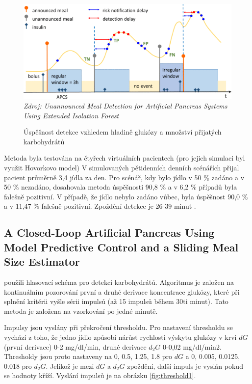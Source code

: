 \begin{figure}[H]
\caption{Úspěšnost detekce vzhledem hladině glukózy a množství přijatých karbohydrátů}
\label{fig:forest}
\includegraphics[width=1\textwidth]{img/analyza/forest.png}\\
\textit{Zdroj: Unannounced Meal Detection for Artificial Pancreas Systems Using Extended Isolation Forest \citep{Analyza.ExtendedIsolationForest}}
\end{figure}

Metoda byla testována na čtyřech virtuálních pacientech (pro jejich simulaci byl využit Hovorkovo model) V simulovaných pětidenních denních scénářích přijal pacient průměrně 3,4 jídla za den. Pro scénář, kdy bylo jídlo v 50 \% zadáno a v 50 \% nezadáno, dosahovala metoda úspěšnosti 90,8 \% a v 6,2 \% případů byla falešně pozitivní. V případě, že jídlo nebylo zadáno vůbec, byla úspěšnost 90,0 \% a v 11,47 \% falešně pozitivní. Zpoždění detekce je 26-39 minut \citep{Analyza.ExtendedIsolationForest}.


\subsection{A Closed-Loop Artificial Pancreas Using Model Predictive Control and a Sliding Meal Size Estimator}
\label{ch:thrashold}

\citet{Analyza.Thresholds} použili hlasovací schéma pro detekci karbohydrátů. Algoritmus je založen na kontinuálním  pozorování první a druhé derivace koncentrace glukózy, které při splnění kritérii vyšle sérii impulsů (až 15 impulsů během 30ti minut). Tato metoda je založena na vzorkování po jedné minutě.

Impulsy jsou vyslány při překročení thresholdu. Pro nastavení thresholdu se vychází z toho, že jedno jídlo způsobí nárůst rychlosti výskytu glukózy v krvi $dG$ (první derivace) 0-2 mg/dl/min, druhé derivace $d_{2}G$ 0-0,02 mg/dl/min2. Thresholdy jsou proto nastaveny na {0, 0.5, 1.25, 1.8} pro $dG$ a {0, 0.005, 0.0125, 0.018} pro $d_{2}G$. Jelikož je mezi $dG$ a $d_{2}G$ zpoždění, další impuls je vyslán pokud se hodnoty kříží. Vyslání impulsů je na obrázku \ref{fig:threshold1}.
 
